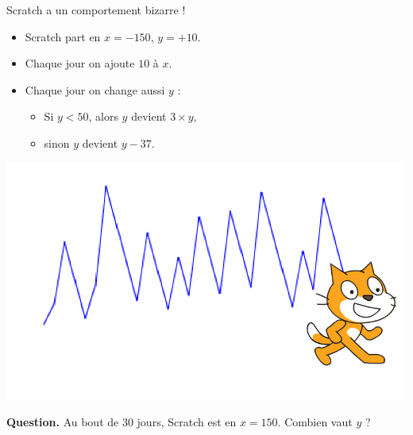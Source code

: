\documentclass[class=report,crop=false, 12pt]{standalone}
\begin{document}
\begin{enigme}

Scratch a un comportement bizarre !

\begin{itemize}
  \item Scratch part en $x=-150$, $y=+10$.
  
  \item Chaque jour on ajoute $10$ à $x$.
  
  \item Chaque jour on change aussi $y$ :
  \begin{itemize}
    \item Si $y<50$, alors $y$ devient $3 \times y$,
    \item sinon $y$ devient $y - 37$.
  \end{itemize}
  
\end{itemize}


\begin{center}
  \includegraphics[scale=\scaleecran,scale=0.85]{ecran-07-eg2} 
\end{center}




\bigskip

\textbf{Question.} Au bout de $30$ jours, Scratch est en $x=150$.
Combien vaut $y$ ?

\bigskip



\end{enigme}
\end{document}
